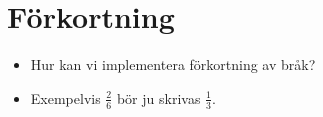 \section{Förkortning}

\begin{frame}
  \begin{exercise}
    \begin{itemize}
      \item Hur kan vi implementera förkortning av bråk?
      \item Exempelvis \(\frac{2}{6}\) bör ju skrivas \(\frac{1}{3}\).
    \end{itemize}
  \end{exercise}
\end{frame}
